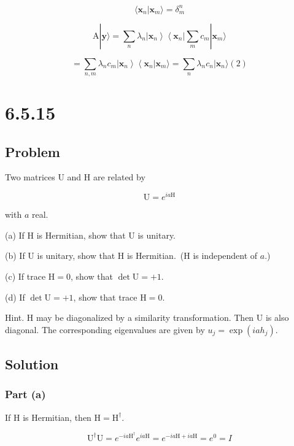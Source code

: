 \documentclass[12pt]{article}
\begin{document}
\[
    \langle\mathbf{x}_n | \mathbf{x}_m\rangle = \delta^n_m
\]

\[
    \mathrm{A}|\mathbf{y}\rangle = \sum_{n} \lambda_n\left|\mathbf{x}_n\right\rangle\left\langle\mathbf{x}_n\right|\sum_{m} c_m |\mathbf{x}_m\rangle
\]

\[
    = \sum_{n, m} \lambda_n c_m\left|\mathbf{x}_n\right\rangle\left\langle\mathbf{x}_n\right|\mathbf{x}_m\rangle
    = \sum_{n} \lambda_n c_n |\mathbf{x}_n\rangle (2)
\]

\newpage
\section{6.5.15}

\subsection{Problem}

Two matrices \(\mathrm{U}\) and \(\mathrm{H}\) are related by

\[
    \mathrm{U}=e^{i a \mathrm{H}}
\]

with \(a\) real.

(a) If \(\mathrm{H}\) is Hermitian, show that \(\mathrm{U}\) is unitary.

(b) If \(\mathrm{U}\) is unitary, show that \(\mathrm{H}\) is Hermitian.\ (\(\mathrm{H}\) is independent of \(a\).)

(c) If trace \(\mathrm{H}=0\), show that \(\operatorname{\det} \mathrm{U}=+1\).

(d) If \(\operatorname{\det} \mathrm{U}=+1\), show that trace \(\mathrm{H}=0\).

Hint. \(\mathrm{H}\) may be diagonalized by a similarity transformation. Then \(\mathrm{U}\) is also diagonal. The corresponding eigenvalues are given by \(u_j=\exp \left(i a h_j\right)\).

\subsection{Solution}

\subsubsection{Part (a)}

If \(\mathrm{H}\) is Hermitian, then \(\mathrm{H} = \mathrm{H}^\dagger \).

\[
    \mathrm{U}^\dagger \mathrm{U} = e^{-i a \mathrm{H^\dagger}} e^{i a \mathrm{H}} = e^{-i a \mathrm{H} + i a \mathrm{H}} = e^{0} = I
\]
\end{document}
